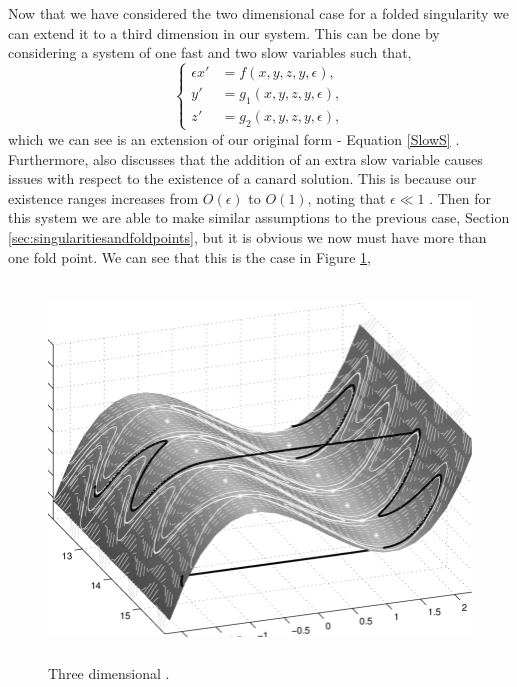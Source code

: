 Now that we have considered the two dimensional case for a folded singularity we can extend it to a third dimension in our system. This can be done by considering a system of one fast and two slow variables such that, 
\begin{equation}
\begin{cases}
\epsilon x'&=f(x,y,z,y,\epsilon),\\
y'&=g_1(x,y,z,y,\epsilon),\\
z'&=g_2(x,y,z,y,\epsilon),
\end{cases}\label{eq: fs singularity system}
\end{equation}
which we can see is an extension of our original form - Equation \ref{SlowS} \citep{MMO}. Furthermore, \citet{MMO} also discusses that the addition of an extra slow variable causes issues with respect to the existence of a canard solution. This is because our existence ranges increases from $ O(\epsilon) $ to $ O(1) $, noting that $ \epsilon\ll 1 $ \citep{MMO}. Then for this system we are able to make similar assumptions to the previous case, Section \ref{sec:singularitiesandfoldpoints}, but it is obvious we now must have more than one fold point. We can see that this is the case in Figure \ref{fig: 3d folded singularity},
\begin{figure}[h!]\centering
	\includegraphics[height=10cm,width=14cm]{Images/Three-dimensional-plot-of-a-trajectory-for-the-van-der-Pol-equation-and-the-critical}
	\caption{Three dimensional \vdp \citep{3D-VdP}.}
	\label{fig: 3d folded singularity}
\end{figure}\newpage
